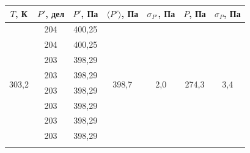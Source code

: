 \documentclass[a4paper, 12pt]{article}
\begin{document}
    \begin{table}[H]
    	\centering
    	\begin{tabular}{ccccccc}
    		\hline
    		\multicolumn{1}{|c|}{$ T $, К} &
    		\multicolumn{1}{c|}{$ P' $, дел} &
    		\multicolumn{1}{c|}{$ P' $, Па} &
    		\multicolumn{1}{c|}{$ \langle P' \rangle $, Па} &
    		\multicolumn{1}{c|}{$ \sigma_{P'} $, Па} &
    		\multicolumn{1}{c|}{$ P $, Па} &
    		\multicolumn{1}{c|}{$ \sigma_P $, Па} \\ \hline
                \multicolumn{1}{|c|}{\multirow{10}{*}{303,2}} & \multicolumn{1}{c|}{204} & \multicolumn{1}{c|}{400,25} & \multicolumn{1}{c|}{\multirow{10}{*}{398,7}} & \multicolumn{1}{c|}{\multirow{10}{*}{2,0}} & \multicolumn{1}{c|}{\multirow{10}{*}{274,3}} & \multicolumn{1}{c|}{\multirow{10}{*}{3,4}} \\ \cline{2-3}
                \multicolumn{1}{|c|}{} & \multicolumn{1}{c|}{204} & \multicolumn{1}{c|}{400,25} & \multicolumn{1}{c|}{} & \multicolumn{1}{c|}{} & \multicolumn{1}{c|}{} & \multicolumn{1}{c|}{} \\ \cline{2-3}
                \multicolumn{1}{|c|}{} & \multicolumn{1}{c|}{203} & \multicolumn{1}{c|}{398,29} & \multicolumn{1}{c|}{} & \multicolumn{1}{c|}{} & \multicolumn{1}{c|}{} & \multicolumn{1}{c|}{} \\ \cline{2-3}
                \multicolumn{1}{|c|}{} & \multicolumn{1}{c|}{203} & \multicolumn{1}{c|}{398,29} & \multicolumn{1}{c|}{} & \multicolumn{1}{c|}{} & \multicolumn{1}{c|}{} & \multicolumn{1}{c|}{} \\ \cline{2-3}
                \multicolumn{1}{|c|}{} & \multicolumn{1}{c|}{203} & \multicolumn{1}{c|}{398,29} & \multicolumn{1}{c|}{} & \multicolumn{1}{c|}{} & \multicolumn{1}{c|}{} & \multicolumn{1}{c|}{} \\ \cline{2-3}
                \multicolumn{1}{|c|}{} & \multicolumn{1}{c|}{203} & \multicolumn{1}{c|}{398,29} & \multicolumn{1}{c|}{} & \multicolumn{1}{c|}{} & \multicolumn{1}{c|}{} & \multicolumn{1}{c|}{} \\ \cline{2-3}
                \multicolumn{1}{|c|}{} & \multicolumn{1}{c|}{203} & \multicolumn{1}{c|}{398,29} & \multicolumn{1}{c|}{} & \multicolumn{1}{c|}{} & \multicolumn{1}{c|}{} & \multicolumn{1}{c|}{} \\ \cline{2-3}
                \multicolumn{1}{|c|}{} & \multicolumn{1}{c|}{203} & \multicolumn{1}{c|}{398,29} & \multicolumn{1}{c|}{} & \multicolumn{1}{c|}{} & \multicolumn{1}{c|}{} & \multicolumn{1}{c|}{} \\ \cline{2-3}

\end{tabular}
\end{table}
\end{document}
